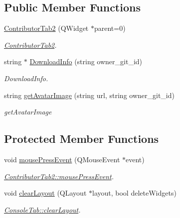 \subsection*{Public Member Functions}
\begin{DoxyCompactItemize}
\item 
\hyperlink{classContributorTab2_afb63f19687c265fe4fc325040cc2d8d7}{Contributor\+Tab2} (Q\+Widget $\ast$parent=0)
\begin{DoxyCompactList}\small\item\em \hyperlink{classContributorTab2}{Contributor\+Tab2}. \end{DoxyCompactList}\item 
string $\ast$ \hyperlink{classContributorTab2_a5b9c63b5497b9e095624cd01969f0101}{Download\+Info} (string owner\+\_\+git\+\_\+id)
\begin{DoxyCompactList}\small\item\em Download\+Info. \end{DoxyCompactList}\item 
string \hyperlink{classContributorTab2_aed6aceb6bd6c0fb3d32e435a731133d8}{get\+Avatar\+Image} (string url, string owner\+\_\+git\+\_\+id)
\begin{DoxyCompactList}\small\item\em get\+Avatar\+Image \end{DoxyCompactList}\end{DoxyCompactItemize}
\subsection*{Protected Member Functions}
\begin{DoxyCompactItemize}
\item 
void \hyperlink{classContributorTab2_a93c3ed51e9f40c439ed4182e4407434a}{mouse\+Press\+Event} (Q\+Mouse\+Event $\ast$event)
\begin{DoxyCompactList}\small\item\em \hyperlink{classContributorTab2_a93c3ed51e9f40c439ed4182e4407434a}{Contributor\+Tab2\+::mouse\+Press\+Event}. \end{DoxyCompactList}\item 
void \hyperlink{classContributorTab2_a7bc323cf603d03913d96ade9536d8f7e}{clear\+Layout} (Q\+Layout $\ast$layout, bool delete\+Widgets)
\begin{DoxyCompactList}\small\item\em \hyperlink{classConsoleTab_aae70e23b23e401b219edefcac4882eaf}{Console\+Tab\+::clear\+Layout}. \end{DoxyCompactList}\end{DoxyCompactItemize}
